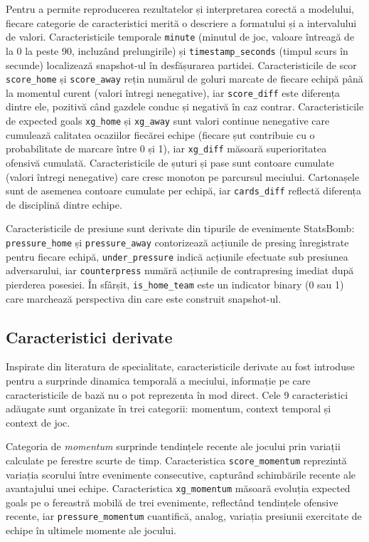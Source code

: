 Pentru a permite reproducerea rezultatelor și interpretarea corectă a
modelului, fiecare categorie de caracteristici merită o descriere a
formatului și a intervalului de valori. Caracteristicile temporale
\texttt{minute} (minutul de joc, valoare întreagă de la 0 la peste 90,
incluzând prelungirile) și \texttt{timestamp\_seconds} (timpul scurs în
secunde) localizează snapshot-ul în desfășurarea partidei. Caracteristicile
de scor \texttt{score\_home} și \texttt{score\_away} rețin numărul de goluri
marcate de fiecare echipă până la momentul curent (valori întregi
nenegative), iar \texttt{score\_diff} este diferența dintre ele, pozitivă
când gazdele conduc și negativă în caz contrar. Caracteristicile de
expected goals \texttt{xg\_home} și \texttt{xg\_away} sunt valori continue
nenegative care cumulează calitatea ocaziilor fiecărei echipe (fiecare șut
contribuie cu o probabilitate de marcare între 0 și 1), iar
\texttt{xg\_diff} măsoară superioritatea ofensivă cumulată.
Caracteristicile de șuturi și pase sunt contoare cumulate (valori întregi
nenegative) care cresc monoton pe parcursul meciului. Cartonașele sunt de
asemenea contoare cumulate per echipă, iar \texttt{cards\_diff} reflectă
diferența de disciplină dintre echipe.

Caracteristicile de presiune sunt derivate din tipurile de evenimente
StatsBomb: \texttt{pressure\_home} și \texttt{pressure\_away} contorizează
acțiunile de presing înregistrate pentru fiecare echipă, \texttt{under\_pressure}
indică acțiunile efectuate sub presiunea adversarului, iar
\texttt{counterpress} numără acțiunile de contrapresing imediat după
pierderea posesiei. În sfârșit, \texttt{is\_home\_team} este un indicator
binary (0 sau 1) care marchează perspectiva din care este construit
snapshot-ul.

\subsection{Caracteristici derivate}

Inspirate din literatura de specialitate, caracteristicile derivate au fost
introduse pentru a surprinde dinamica temporală a meciului, informație pe
care caracteristicile de bază nu o pot reprezenta în mod direct. Cele 9
caracteristici adăugate sunt organizate în trei categorii: momentum,
context temporal și context de joc.

Categoria de \textit{momentum} surprinde tendințele recente ale jocului
prin variații calculate pe ferestre scurte de timp. Caracteristica
\texttt{score\_momentum} reprezintă variația scorului între evenimente
consecutive, capturând schimbările recente ale avantajului unei echipe.
Caracteristica \texttt{xg\_momentum} măsoară evoluția expected goals pe o
fereastră mobilă de trei evenimente, reflectând tendințele ofensive
recente, iar \texttt{pressure\_momentum} cuantifică, analog, variația
presiunii exercitate de echipe în ultimele momente ale jocului.

